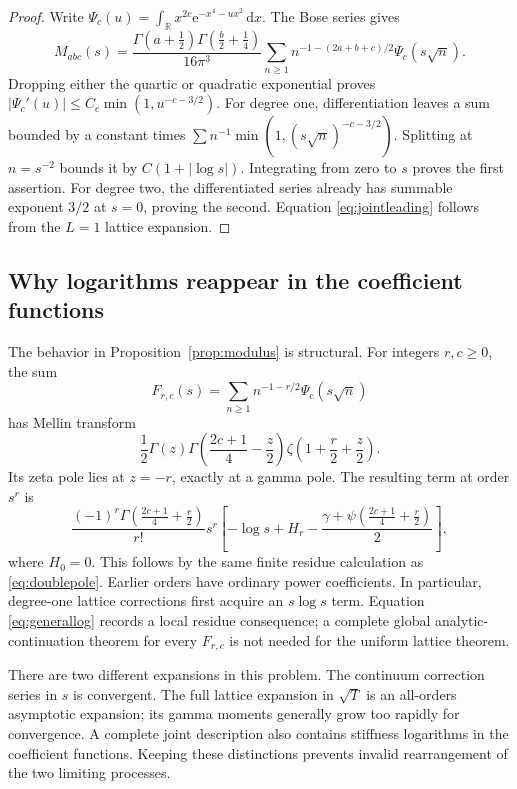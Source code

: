 \documentclass[11pt,a4paper]{article}
\numberwithin{equation}{section}
\theoremstyle{definition}
\newcommand{\R}{\mathbb R}
\newcommand{\dd}{\,\mathrm d}
\newcommand{\e}{\mathrm e}
\begin{document}
\begin{proof}
Write $\Psi_c(u)=\int_{\R} x^{2c}\e^{-x^4-u x^2}\dd x$.
The Bose series gives
\begin{equation}
 M_{abc}(s)=\frac{\Gamma(a+\frac12)\Gamma(\frac b2+\frac14)}{16\pi^3}
 \sum_{n\ge1}n^{-1-(2a+b+c)/2}\Psi_c(s\sqrt n).
 \label{eq:momentseries}
\end{equation}
Dropping either the quartic or quadratic exponential proves
$|\Psi_c'(u)|\le C_c\min(1,u^{-c-3/2})$.
For degree one, differentiation leaves a sum bounded by a constant
times $\sum n^{-1}\min(1,(s\sqrt n)^{-c-3/2})$.
Splitting at $n=s^{-2}$ bounds it by $C(1+|\log s|)$.
Integrating from zero to $s$ proves the first assertion. For degree
two, the differentiated series already has summable exponent $3/2$
at $s=0$, proving the second. Equation \eqref{eq:jointleading} follows
from the $L=1$ lattice expansion.
\end{proof}

\subsection{Why logarithms reappear in the coefficient functions}

The behavior in Proposition~\ref{prop:modulus} is structural. For
integers $r,c\ge0$, the sum
\[
 F_{r,c}(s)=\sum_{n\ge1}n^{-1-r/2}\Psi_c(s\sqrt n)
\]
has Mellin transform
\begin{equation}
 \frac12\Gamma(z)\Gamma\left(\frac{2c+1}{4}-\frac z2\right)
      \zeta\left(1+\frac r2+\frac z2\right).
 \label{eq:generalmellin}
\end{equation}
Its zeta pole lies at $z=-r$, exactly at a gamma pole. The resulting
term at order $s^r$ is
\begin{equation}
 \frac{(-1)^r\Gamma(\frac{2c+1}{4}+\frac r2)}{r!}s^r
 \left[-\log s+H_r-
 \frac{\gamma+\psi(\frac{2c+1}{4}+\frac r2)}2\right],
 \label{eq:generallog}
\end{equation}
where $H_0=0$. This follows by the same finite residue calculation as
\eqref{eq:doublepole}. Earlier orders have ordinary power coefficients.
In particular, degree-one lattice corrections first acquire an
$s\log s$ term. Equation \eqref{eq:generallog} records a local residue
consequence; a complete global analytic-continuation theorem for every
$F_{r,c}$ is not needed for the uniform lattice theorem.

There are two different expansions in this problem. The continuum
correction series in $s$ is convergent. The full lattice expansion in
$\sqrt T$ is an all-orders asymptotic expansion; its gamma moments
generally grow too rapidly for convergence. A complete joint
description also contains stiffness logarithms in the coefficient
functions. Keeping these distinctions prevents invalid rearrangement
of the two limiting processes.
\end{document}
